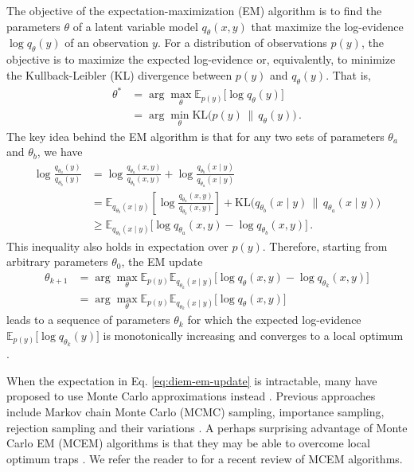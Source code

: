 The objective of the expectation-maximization (EM) algorithm \cite{hartley1958maximum, dempster1977maximum, wu1983convergence, mclachlan2007em, balakrishnan2017statistical} is to find the parameters $\theta$ of a latent variable model $q_\theta(x, y)$ that maximize the log-evidence $\log q_\theta(y)$ of an observation $y$. For a distribution of observations $p(y)$, the objective is to maximize the expected log-evidence \cite{mclachlan2007em, balakrishnan2017statistical} or, equivalently, to minimize the Kullback-Leibler (KL) divergence between $p(y)$ and $q_\theta(y)$. That is,
\begin{align}
    \theta^* & = \arg\max_\theta \mathbb{E}_{p(y)} \big[ \log q_\theta(y) \big] \\
    & = \arg\min_\theta \mathrm{KL} \big( p(y) \, \| \, q_\theta(y) \big) \, .
\end{align}
The key idea behind the EM algorithm is that for any two sets of parameters $\theta_a$ and $\theta_b$, we have
\begin{align}
    \log \frac{q_{\theta_a}(y)}{q_{\theta_b}(y)}
    & = \log \frac{q_{\theta_a}(x, y)}{q_{\theta_b}(x, y)} + \log \frac{q_{\theta_b}(x \mid y)}{q_{\theta_a}(x \mid y)} \\
    & = \mathbb{E}_{q_{\theta_b}(x \mid y)} \left[ \log \frac{q_{\theta_a}(x, y)}{q_{\theta_b}(x, y)} \right] + \mathrm{KL} \big( q_{\theta_b}(x \mid y) \, \| \, q_{\theta_a}(x \mid y) \big) \\
    & \geq \mathbb{E}_{q_{\theta_b}(x \mid y)} \big[ \log q_{\theta_a}(x, y) -  \log q_{\theta_b}(x, y) \big] \, .
\end{align}
This inequality also holds in expectation over $p(y)$. Therefore, starting from arbitrary parameters $\theta_0$, the EM update
\begin{align}
    \theta_{k+1} & = \arg\max_\theta \mathbb{E}_{p(y)} \mathbb{E}_{q_{\theta_k}(x \mid y)} \big[ \log q_\theta(x, y) - \log q_{\theta_k}(x, y)\big] \\
    & = \arg\max_\theta \mathbb{E}_{p(y)} \mathbb{E}_{q_{\theta_k}(x \mid y)} \big[ \log q_\theta(x, y) \big] \label{eq:diem-em-update}
\end{align}
leads to a sequence of parameters $\theta_k$ for which the expected log-evidence $\mathbb{E}_{p(y)} \big[ \log q_{\theta_k}(y) \big]$ is monotonically increasing and converges to a local optimum \cite{wu1983convergence, mclachlan2007em, balakrishnan2017statistical}.

When the expectation in Eq. \eqref{eq:diem-em-update} is intractable, many have proposed to use Monte Carlo approximations instead \cite{wei1990monte, celeux1992stochastic, delyon1999convergence, booth1999maximizing, levine2001implementations, caffo2005ascentbased, jank2006em, ruth2024review}. Previous approaches include Markov chain Monte Carlo (MCMC) sampling, importance sampling, rejection sampling and their variations \cite{levine2001implementations, caffo2005ascentbased, jank2006em, ruth2024review}. A perhaps surprising advantage of Monte Carlo EM (MCEM) algorithms is that they may be able to overcome local optimum traps \cite{celeux1992stochastic, delyon1999convergence}. We refer the reader to \textcite{ruth2024review} for a recent review of MCEM algorithms.

